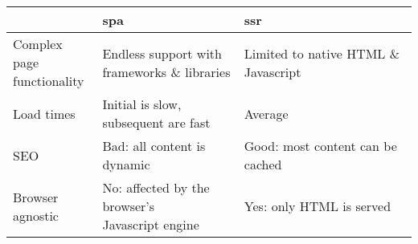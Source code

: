 \begin{tabular}{lll}
  & \gls{spa} & \gls{ssr} \\ \hline
  
  \makecell[l]{Complex page\\functionality} & \makecell[l]{Endless support with\\frameworks \& libraries} & Limited to native HTML \& Javascript \\

  Load times & \makecell[l]{Initial is slow,\\subsequent are fast} & Average \\

  SEO & Bad: all content is dynamic & Good: most content can be cached \\

  \makecell[l]{Browser\\agnostic} & \makecell[l]{No: affected by the browser's\\Javascript engine} & Yes: only HTML is served \\
\end{tabular}
